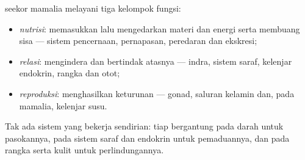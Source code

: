 \begin{proposition}\label{prop:b1:mammal-organization:functions}
 seekor mamalia melayani tiga kelompok fungsi:
\begin{itemize}
  \item \emph{nutrisi}: memasukkan lalu
        mengedarkan materi dan energi serta membuang sisa --- sistem
        pencernaan, pernapasan, peredaran dan ekskresi;
  \item \emph{relasi}: mengindera  dan
        bertindak atasnya --- indra, sistem saraf, kelenjar endokrin,
        rangka dan otot;
  \item \emph{reproduksi}: menghasilkan
        keturunan --- gonad, saluran kelamin dan, pada mamalia,
        kelenjar susu.
\end{itemize}
Tak ada sistem yang bekerja sendirian: tiap  bergantung pada darah
untuk pasokannya, pada sistem saraf dan endokrin untuk pemaduannya, dan
pada rangka serta kulit untuk perlindungannya.
\end{proposition}

